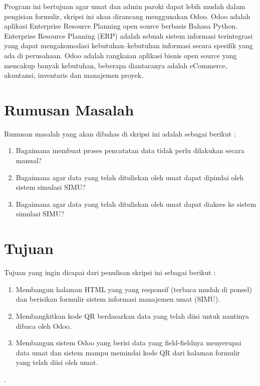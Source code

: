 \documentclass[a4paper,twoside]{article}
\begin{document}
Program ini bertujuan agar umat dan admin paroki dapat lebih mudah dalam pengisian formulir, skripsi ini akan dirancang menggunakan Odoo. Odoo adalah aplikasi Enterprise Resource Planning open source berbasis Bahasa Python. Enterprise Resource Planning (ERP) adalah sebuah sistem informasi terintegrasi yang dapat mengakomodasi kebutuhan–kebutuhan informasi secara spesifik yang ada di perusahaan. Odoo adalah rangkaian aplikasi bisnis open source yang mencakup banyak kebutuhan, beberapa diantaranya adalah eCommerce, akuntansi, inventaris dan manajemen proyek.


\section{Rumusan Masalah}
Rumusan masalah yang akan dibahas di skripsi ini adalah sebagai berikut :
\begin{enumerate}
	\item Bagaimana membuat proses pencatatan data tidak perlu dilakukan secara manual?
	\item Bagaimana agar data yang telah dituliskan oleh umat dapat dipindai oleh sistem simulasi SIMU?
	\item Bagaimana agar data yang telah dituliskan oleh umat dapat diakses ke sistem simulasi SIMU?
\end{enumerate}

\section{Tujuan}
Tujuan yang ingin dicapai dari penulisan skripsi ini sebagai berikut :
\begin{enumerate}
	\item Membangun halaman HTML yang yang responsif (terbaca mudah di ponsel) dan berisikan formulir sistem informasi manajemen umat (SIMU).
	\item Membangkitkan kode QR berdasarkan data yang telah diisi untuk nantinya dibaca oleh Odoo.
	\item Membangun sistem Odoo yang berisi data yang field-fieldnya menyerupai data umat dan sistem mampu memindai kode QR dari halaman formulir yang telah diisi oleh umat.
\end{enumerate}.
\end{document}
